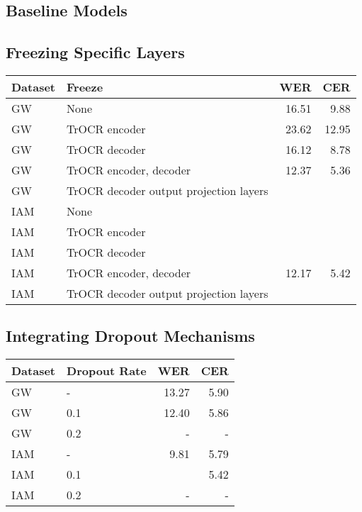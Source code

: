 \subsection{Baseline Models}
\label{subsec:5_baseline_models}
\subsection{Freezing Specific Layers}
\label{subsec:5_freezing_specific_layers}
\begin{tabular}{l|l||r|r}
    Dataset	& Freeze	& WER	& CER		\\
    \hline
    \hline
    GW		& None		& 16.51	& 9.88	\\
    GW		& TrOCR encoder		& 23.62	& 12.95	\\
    GW	& TrOCR decoder	& 16.12	& 8.78	\\
    GW	& TrOCR encoder, decoder	& 12.37	& 5.36	\\
    GW	& TrOCR decoder output projection layers	&  &  	\\
    \hline
    IAM		& None		& 	& 	\\
    IAM		& TrOCR encoder		& 	& \\
    IAM	& TrOCR decoder	& & 	\\
    IAM	& TrOCR encoder, decoder	& 12.17	& 5.42	\\
    IAM	& TrOCR decoder output projection layers	&  &  	\\
    \hline
    \end{tabular}
\subsection{Integrating Dropout Mechanisms}
\label{subsec:5_integrating_dropout_mechanisms}
\begin{tabular}{l|l||r|r}
    Dataset	& Dropout Rate	& WER	& CER		\\
    \hline
    \hline
    GW		& -		& 13.27	& 5.90	\\
    GW		& 0.1		& 12.40 & 5.86	\\
    GW		& 0.2	& - & -	\\
    \hline
    IAM		& -		& 9.81	& 5.79	\\
    IAM		& 0.1		& 	& 5.42	\\
    IAM		& 0.2	& - & -	\\
    \end{tabular}
